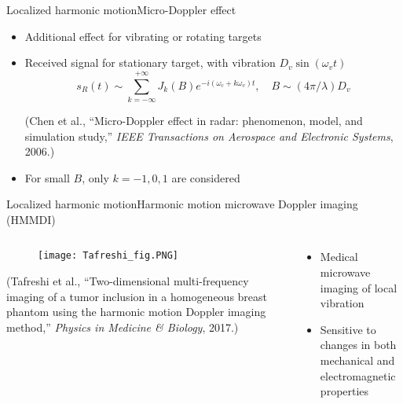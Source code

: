 \documentclass[11pt]{beamer}
\begin{document}
	\begin{frame}{Localized harmonic motion}{Micro-Doppler effect}
		\begin{itemize}
			\pause
			\item Additional effect for vibrating or rotating targets
			\pause
			\item Received signal for stationary target, with vibration $D_v \sin(\omega_v t)$
			\begin{equation*}
				s_R(t) \sim \sum_{k=-\infty}^{+\infty} J_k(B) e^{-i(\omega_c +k \omega_v)t}, \quad B \sim (4\pi/\lambda)D_v
			\end{equation*}
			\parbox{\linewidth}{\tiny (Chen et al., “Micro-Doppler effect in radar: phenomenon, model, and simulation study,” \emph{IEEE Transactions on Aerospace and Electronic Systems}, 2006.)}
			\pause
			\item For small $B$, only $k = -1, 0, 1$ are considered
		\end{itemize}
	\end{frame}
	
	\begin{frame}{Localized harmonic motion}{Harmonic motion microwave Doppler imaging (HMMDI)}
		\begin{columns}
			\begin{column}{0.5\textwidth}
				\begin{figure}
					\centering
					\texttt{[image: Tafreshi\_fig.PNG]}
				\end{figure}
				\parbox{\linewidth}{\tiny (Tafreshi et al., “Two-dimensional multi-frequency imaging of a tumor inclusion in a homogeneous breast phantom using the harmonic motion Doppler imaging method,” \emph{Physics in Medicine \& Biology}, 2017.)}
			\end{column}
			\pause
			\begin{column}{0.5\textwidth}
				\begin{itemize}
					\item Medical microwave imaging of local vibration
					\pause
					\item Sensitive to changes in both mechanical and electromagnetic properties
				\end{itemize}
			\end{column}
		\end{columns}
	\end{frame}
	
\end{document}

